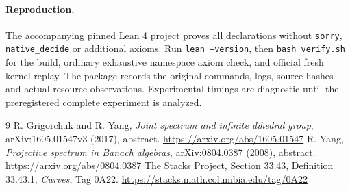 \documentclass[11pt]{article}
\begin{document}
\paragraph{Reproduction.}
The accompanying pinned Lean 4 project proves all declarations without
\texttt{sorry}, \texttt{native\_decide} or additional axioms. Run
\texttt{lean --version}, then \texttt{bash verify.sh} for the build,
ordinary exhaustive namespace axiom check, and official fresh kernel replay.
The package records the original commands, logs, source hashes and actual
resource observations. Experimental timings are diagnostic until the
preregistered complete experiment is analyzed.

\begin{thebibliography}{9}\small
{} R. Grigorchuk and R. Yang,
\emph{Joint spectrum and infinite dihedral group}, arXiv:1605.01547v3 (2017), abstract.
\url{https://arxiv.org/abs/1605.01547}
 R. Yang, \emph{Projective spectrum in Banach algebras},
arXiv:0804.0387 (2008), abstract.
\url{https://arxiv.org/abs/0804.0387}
 The Stacks Project, Section 33.43, Definition 33.43.1,
\emph{Curves}, Tag 0A22.
\url{https://stacks.math.columbia.edu/tag/0A22}
\end{thebibliography}
\end{document}
